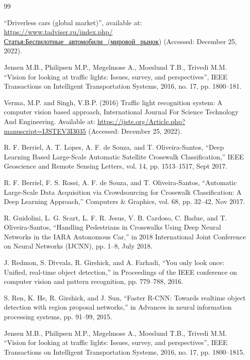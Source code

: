 \documentclass{misisarticle}
\begin{document}
\begin{thebibliography}{99}

 “Driverless cars (global market)”, available at: \url{https://www.tadviser.ru/index.php/Статья:Беспилотные\_автомобили\_(мировой\_рынок}) (Accessed: December 25, 2022).

 Jensen M.B., Philipsen M.P., Møgelmose A., Moeslund T.B., Trivedi M.M. “Vision for looking at traffic lights: Issues, survey, and perspectives”, IEEE Transactions on Intelligent Transportation Systems, 2016, no. 17, pp. 1800–181.

 Verma, M.P. and Singh, V.B.P. (2016) Traffic light recognition system: A computer vision based approach, International Journal For Science Technology And Engineering. Available at: \url{https://ijste.org/Article.php?manuscript=IJSTEV3I3035} (Accessed: December 25, 2022).

 R. F. Berriel, A. T. Lopes, A. F. de Souza, and T. Oliveira-Santos, “Deep Learning Based Large-Scale Automatic Satellite Crosswalk Classification,” IEEE Geoscience and Remote Sensing Letters, vol. 14, pp. 1513–1517, Sept 2017.

 R. F. Berriel, F. S. Rossi, A. F. de Souza, and T. Oliveira-Santos, “Automatic Large-Scale Data Acquisition via Crowdsourcing for Crosswalk Classification: A Deep Learning Approach,” Computers \& Graphics, vol. 68, pp. 32–42, Nov 2017.

 R. Guidolini, L. G. Scart, L. F. R. Jesus, V. B. Cardoso, C. Badue, and T. Oliveira-Santos, “Handling Pedestrians in Crosswalks Using Deep Neural Networks in the IARA Autonomous Car,” in 2018 International Joint Conference on Neural Networks (IJCNN), pp. 1–8, July 2018.

 J. Redmon, S. Divvala, R. Girshick, and A. Farhadi, “You only look once: Unified, real-time object detection,” in Proceedings of the IEEE conference on computer vision and pattern recognition, pp. 779–788, 2016.

 S. Ren, K. He, R. Girshick, and J. Sun, “Faster R-CNN: Towards realtime object detection with region proposal networks,” in Advances in neural information processing systems, pp. 91–99, 2015.

 Jensen M.B., Philipsen M.P., Møgelmose A., Moeslund T.B., Trivedi M.M. “Vision for looking at traffic lights: Issues, survey, and perspectives”, IEEE Transactions on Intelligent Transportation Systems, 2016, no. 17, pp. 1800–1815.


\end{thebibliography}
\end{document}
